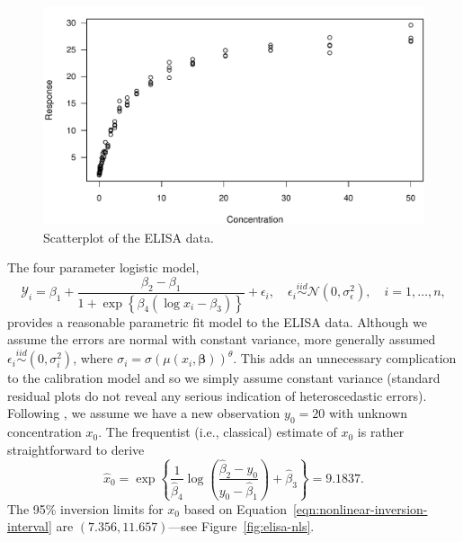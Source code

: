 \documentclass[cmfont,usenames,dvipsnames,leqno]{afit-etd}\usepackage[]{graphicx}\usepackage[]{color}
\makeatletter
\def\maxwidth{ %
  \ifdim\Gin@nat@width>\linewidth
    \linewidth
  \else
    \Gin@nat@width
  \fi
}
\newenvironment{knitrout}{}{} %
\renewenvironment{knitrout}{\begin{singlespace}}{\end{singlespace}}
\newcommand{\mc}[1]{\ensuremath{\mathcal{#1}}}
\newcommand{\wh}[1]{\ensuremath{\widehat{#1}}}
\makeatother
\begin{document}
\begin{knitrout}
\color{fgcolor}\begin{figure}[H]

\includegraphics[width=\maxwidth]{figure/elisa-scatter} \caption[Scatterplot of the ELISA data]{Scatterplot of the ELISA data.\label{fig:elisa-scatter}}
\end{figure}


\end{knitrout}


The four parameter logistic model, 
\begin{equation*}
  \mc{Y}_i = \beta_1 + \frac{\beta_2 - \beta_1}{1 + \exp\left\{ \beta_4(\log x_i - \beta_3) \right\}} + \epsilon_i, \quad \epsilon_i \stackrel{iid}{\sim} \mc{N}\left(0, \sigma_\epsilon^2\right), \quad i = 1, \dotsc, n,
\end{equation*}
provides a reasonable parametric fit model to the ELISA data. Although we assume the errors are normal with constant variance, \citet{ori_constructing_1995} more generally assumed $\epsilon_i \stackrel{iid}{\sim} (0, \sigma_i^2)$, where $\sigma_i = \sigma\left(\mu(x_i, \bm{\beta})\right)^\theta$. This adds an unnecessary complication to the calibration model and so we simply assume constant variance (standard residual plots do not reveal any serious indication of heteroscedastic errors). Following \citet{ori_constructing_1995}, we assume we have a new observation $y_0 = 20$ with unknown concentration $x_0$. The frequentist (i.e., classical) estimate of $x_0$ is rather straightforward to derive
\begin{equation*}
  \wh{x}_0 = \exp\left\{\frac{1}{\wh{\beta}_4}\log\left(\frac{\wh{\beta}_2-y_0}{y_0-\wh{\beta}_1}\right) + \wh{\beta}_3\right\} = 9.1837.
\end{equation*}
The 95\% inversion limits for $x_0$ based on Equation~\eqref{eqn:nonlinear-inversion-interval} are $(7.356, 11.657)$---see Figure~\ref{fig:elisa-nls}. 
\end{document}
